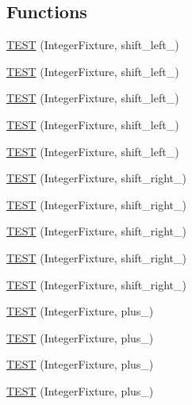 \subsection*{Functions}
\begin{DoxyCompactItemize}
\item 
\hyperlink{bmk447-TestInteger_8c_09_09_a79d81b60294fe0e14df2ff9952a838ed}{T\-E\-S\-T} (Integer\-Fixture, shift\-\_\-left\-\_)
\item 
\hyperlink{bmk447-TestInteger_8c_09_09_af5cb52be897b601f5045042702480f90}{T\-E\-S\-T} (Integer\-Fixture, shift\-\_\-left\-\_)
\item 
\hyperlink{bmk447-TestInteger_8c_09_09_a27501b134bc591f80c7c16ebd128e7c8}{T\-E\-S\-T} (Integer\-Fixture, shift\-\_\-left\-\_)
\item 
\hyperlink{bmk447-TestInteger_8c_09_09_a1d66547a8c4c2b887002cd116d077c79}{T\-E\-S\-T} (Integer\-Fixture, shift\-\_\-left\-\_)
\item 
\hyperlink{bmk447-TestInteger_8c_09_09_a059132a504edf316d612e9322cf8cd0e}{T\-E\-S\-T} (Integer\-Fixture, shift\-\_\-left\-\_)
\item 
\hyperlink{bmk447-TestInteger_8c_09_09_a5d8a5ee89ce8f1537415cc6399e7613c}{T\-E\-S\-T} (Integer\-Fixture, shift\-\_\-right\-\_)
\item 
\hyperlink{bmk447-TestInteger_8c_09_09_ae0bf53c037cf11f0ff338500f32485c1}{T\-E\-S\-T} (Integer\-Fixture, shift\-\_\-right\-\_)
\item 
\hyperlink{bmk447-TestInteger_8c_09_09_aed4ef5d1540f90b4f019bf07b4a54c12}{T\-E\-S\-T} (Integer\-Fixture, shift\-\_\-right\-\_)
\item 
\hyperlink{bmk447-TestInteger_8c_09_09_a8929353517b37ff00a201b58f3a96c3a}{T\-E\-S\-T} (Integer\-Fixture, shift\-\_\-right\-\_)
\item 
\hyperlink{bmk447-TestInteger_8c_09_09_a99e26f83d1b84db87726dce6446a18b0}{T\-E\-S\-T} (Integer\-Fixture, shift\-\_\-right\-\_)
\item 
\hyperlink{bmk447-TestInteger_8c_09_09_ab1d7673a4669f1d3502fdc8c625a6475}{T\-E\-S\-T} (Integer\-Fixture, plus\-\_)
\item 
\hyperlink{bmk447-TestInteger_8c_09_09_a7482235e72b1dc7017e23924624d77bf}{T\-E\-S\-T} (Integer\-Fixture, plus\-\_)
\item 
\hyperlink{bmk447-TestInteger_8c_09_09_ade171a7e068d0c882d9e8d00af506a19}{T\-E\-S\-T} (Integer\-Fixture, plus\-\_)
\item 
\hyperlink{bmk447-TestInteger_8c_09_09_a8c2165606d4314585e2fb105ffc04492}{T\-E\-S\-T} (Integer\-Fixture, plus\-\_)

\end{DoxyCompactItemize}

